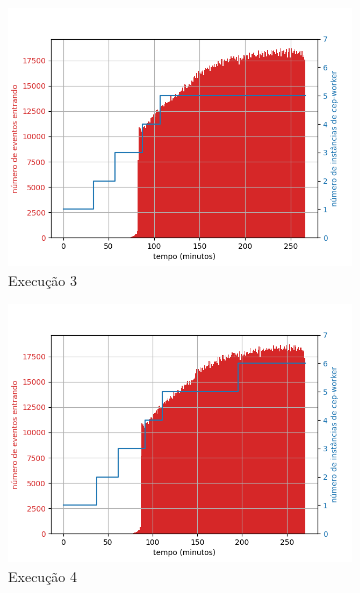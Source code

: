\begin{figure}[p]
\begin{subfigure}{.5\textwidth}
  \centering
  \includegraphics[width=\linewidth]{figuras/graphics/carga_e_workers_total8-dez-is.png}  
  \caption{Execução 3}
  \label{fig:cewt-8-dez-is}
\end{subfigure}
\begin{subfigure}{.5\textwidth}
  \centering
  \includegraphics[width=\linewidth]{figuras/graphics/carga_e_workers_total9-dez-is.png}  
  \caption{Execução 4}
  \label{fig:cewt-9-dez-is}
\end{subfigure}
\begin{subfigure}{.5\textwidth}
  \centering

\end{subfigure}
\end{figure}
